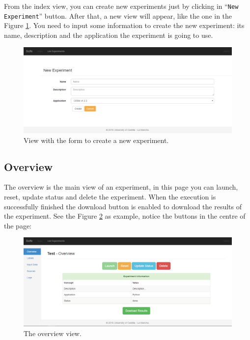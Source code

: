 \documentclass[11pt]{article}
\begin{document}
From the index view, you can create new experiments just by clicking in ``\texttt{New Experiment}'' button. After that, a new view will appear, like the one in the Figure \ref{fig:create}. You need to input some information to create the new experiment: its name, description and the application the experiment is going to use.
\begin{figure}[htp]
	\centering
	\includegraphics[width=\linewidth]{img/create}
	\caption{View with the form to create a new experiment.}
	\label{fig:create}
\end{figure}

\subsection{Overview}\label{sec:overview}
The overview is the main view of an experiment, in this page you can launch, reset, update status and delete the experiment. When the execution is successfully finished the download button is enabled to download the results of the experiment. See the Figure \ref{fig:overview-done} as example, notice the buttons in the centre of the page:
\begin{figure}[htp]
	\centering
	\includegraphics[width=\linewidth]{img/overview-done}
	\caption{The overview view.}
	\label{fig:overview-done}
\end{figure}
\end{document}
